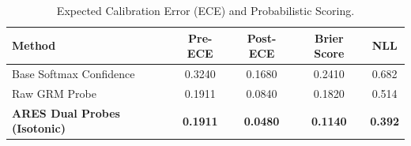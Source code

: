 \begin{table}[h]
\centering
\small
\caption{Expected Calibration Error (ECE) and Probabilistic Scoring.}
\label{tab:calibration}
\begin{tabular}{lcccc}
\toprule
\textbf{Method} & \textbf{Pre-ECE} & \textbf{Post-ECE} & \textbf{Brier Score} & \textbf{NLL} \\
\midrule
Base Softmax Confidence & 0.3240 & 0.1680 & 0.2410 & 0.682 \\
Raw GRM Probe & 0.1911 & 0.0840 & 0.1820 & 0.514 \\
\textbf{ARES Dual Probes (Isotonic)} & \textbf{0.1911} & \textbf{0.0480} & \textbf{0.1140} & \textbf{0.392} \\
\bottomrule
\end{tabular}
\end{table}
